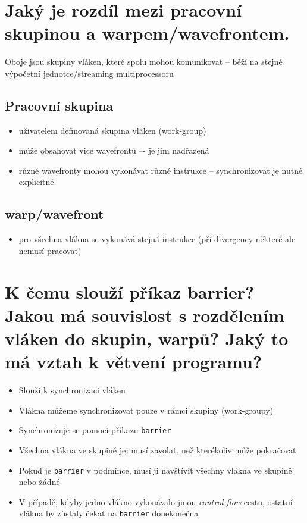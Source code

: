 \section{Jaký je rozdíl mezi pracovní skupinou a warpem/wavefrontem.}
	Oboje jsou skupiny vláken, které spolu mohou komunikovat -- běží na stejné výpočetní jednotce/streaming multiprocessoru
	\subsection*{Pracovní skupina}
		\begin{itemize}
			\setlength\itemsep{0em}
			\item uživatelem definovaná skupina vláken (work-group)
			\item může obsahovat vice wavefrontů –- je jim nadřazená
			\item různé wavefronty mohou vykonávat různé instrukce -- synchronizovat je nutné explicitně
		\end{itemize}
		
	\subsection*{warp/wavefront}
		\begin{itemize}
			\setlength\itemsep{0em}
			\item pro všechna vlákna se vykonává stejná instrukce (při divergency některé ale nemusí pracovat)
		\end{itemize}


\section{K čemu slouží příkaz barrier? Jakou má souvislost s rozdělením vláken do skupin, warpů? Jaký to má vztah k větvení programu?}
	\begin{itemize}
		\item Slouží k synchronizaci vláken
		\item Vlákna můžeme synchronizovat pouze v rámci skupiny (work-groupy)
		\item Synchronizuje se pomocí příkazu \texttt{barrier}
		\item Všechna vlákna ve skupině jej musí zavolat, než kterékoliv může pokračovat
		\item Pokud je \texttt{barrier} v podmínce, musí ji navštívit všechny vlákna ve skupině nebo žádné
		\item V případě, kdyby jedno vlákno vykonávalo jinou \emph{control flow} cestu, ostatní vlákna by zůstaly čekat na \texttt{barrier} donekonečna
	\end{itemize}

	
          

